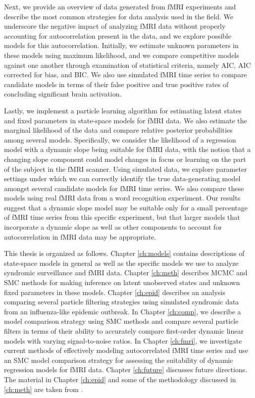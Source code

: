 Next, we provide an overview of data generated from fMRI experiments and describe the most common strategies for data analysis used in the field. We underscore the negative impact of analyzing fMRI data without properly accounting for autocorrelation present in the data, and we explore possible models for this autocorrelation. Initially, we estimate unknown parameters in these models using maximum likelihood, and we compare competitive models against one another through examination of statistical criteria, namely AIC, AIC corrected for bias, and BIC. We also use simulated fMRI time series to compare candidate models in terms of their false positive and true positive rates of concluding significant brain activation.

Lastly, we implement a particle learning algorithm for estimating latent states and fixed parameters in state-space models for fMRI data. We also estimate the marginal likelihood of the data and compare relative posterior probabilities among several models. Specifically, we consider the likelihood of a regression model with a dynamic slope being suitable for fMRI data, with the notion that a changing slope component could model changes in focus or learning on the part of the subject in the fMRI scanner. Using simulated data, we explore parameter settings under which we can correctly identify the true data-generating model amongst several candidate models for fMRI time series. We also compare these models using real fMRI data from a word recognition experiment. Our results suggest that a dynamic slope model may be suitable only for a small percentage of fMRI time series from this specific experiment, but that larger models that incorporate a dynamic slope as well as other components to account for autocorrelation in fMRI data may be appropriate.

This thesis is organized as follows. Chapter \ref{ch:models} contains descriptions of state-space models in general as well as the specific models we use to analyze syndromic surveillance and fMRI data. Chapter \ref{ch:meth} describes MCMC and SMC methods for making inference on latent unobserved states and unknown fixed parameters in these models. Chapter \ref{ch:epid} describes an analysis comparing several particle filtering strategies using simulated syndromic data from an influenza-like epidemic outbreak. In Chapter \ref{ch:comp}, we describe a model comparison strategy using SMC methods and compare several particle filters in terms of their ability to accurately compare first-order dynamic linear models with varying signal-to-noise ratios. In Chapter \ref{ch:fmri}, we investigate current methods of effectively modeling autocorrelated fMRI time series and use an SMC model comparison strategy for assessing the suitability of dynamic regression models for fMRI data. Chapter \ref{ch:future} discusses future directions. The material in Chapter \ref{ch:epid} and some of the methodology discussed in \ref{ch:meth} are taken from \citet{sheinson:niemi:meiring:epidtrack:2014}. 